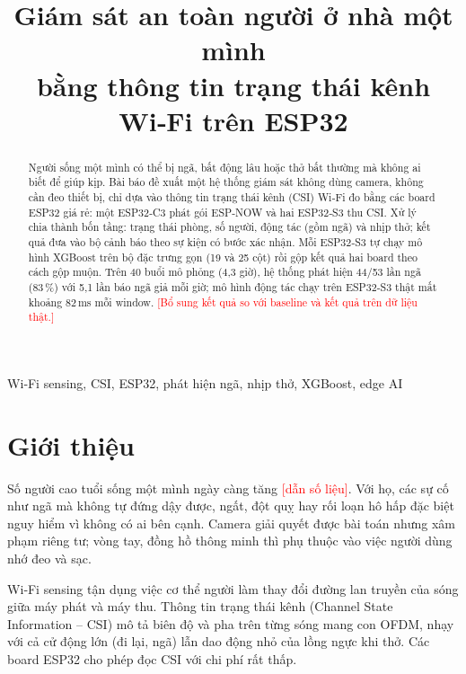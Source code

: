 \documentclass[conference]{IEEEtran}
\newcommand{\canlam}[1]{\textcolor{red}{[#1]}}
\begin{document}
\title{Giám sát an toàn người ở nhà một mình\\bằng thông tin trạng thái kênh Wi‑Fi trên ESP32}

\author{
}

\maketitle

\begin{abstract}
Người sống một mình có thể bị ngã, bất động lâu hoặc thở bất thường mà không ai biết để giúp kịp. Bài báo đề xuất một
hệ thống giám sát không dùng camera, không cần đeo thiết bị, chỉ dựa vào thông tin trạng thái kênh (CSI) Wi‑Fi đo bằng
các board ESP32 giá rẻ: một ESP32‑C3 phát gói ESP‑NOW và hai ESP32‑S3 thu CSI. Xử lý chia thành bốn tầng: trạng thái
phòng, số người, động tác (gồm ngã) và nhịp thở; kết quả đưa vào bộ cảnh báo theo sự kiện có bước xác nhận. Mỗi
ESP32‑S3 tự chạy mô hình XGBoost trên bộ đặc trưng gọn (19 và 25 cột) rồi gộp kết quả hai board theo cách gộp muộn.
Trên 40 buổi mô phỏng (4,3 giờ), hệ thống phát hiện 44/53 lần ngã (83\,\%) với 5,1 lần báo ngã giả mỗi giờ; mô hình
động tác chạy trên ESP32‑S3 thật mất khoảng 82\,ms mỗi window. \canlam{Bổ sung kết quả so với baseline và kết quả trên
dữ liệu thật.}
\end{abstract}

\begin{IEEEkeywords}
Wi‑Fi sensing, CSI, ESP32, phát hiện ngã, nhịp thở, XGBoost, edge AI
\end{IEEEkeywords}

\section{Giới thiệu}
Số người cao tuổi sống một mình ngày càng tăng \canlam{dẫn số liệu}. Với họ, các sự cố như ngã mà không tự đứng dậy
được, ngất, đột quỵ hay rối loạn hô hấp đặc biệt nguy hiểm vì không có ai bên cạnh. Camera giải quyết được bài toán nhưng
xâm phạm riêng tư; vòng tay, đồng hồ thông minh thì phụ thuộc vào việc người dùng nhớ đeo và sạc.

Wi‑Fi sensing tận dụng việc cơ thể người làm thay đổi đường lan truyền của sóng giữa máy phát và máy thu. Thông tin
trạng thái kênh (Channel State Information – CSI) mô tả biên độ và pha trên từng sóng mang con OFDM, nhạy với cả cử động
lớn (đi lại, ngã) lẫn dao động nhỏ của lồng ngực khi thở. Các board ESP32 cho phép đọc CSI với chi phí rất thấp.
\end{document}
